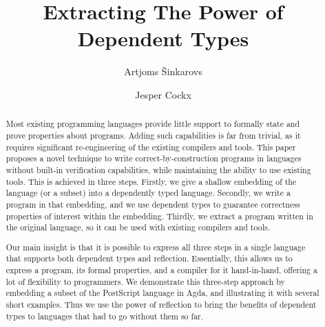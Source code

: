 \documentclass[sigplan,screen]{acmart}
\begin{document}
\title[]{Extracting The Power of Dependent Types}


\author[A. {\v{S}}inkarovs]{Artjoms {\v{S}}inkarovs}


\author[J. Cockx]{Jesper Cockx}


\begin{abstract}

  Most existing programming languages provide little support to formally
  state and prove properties about programs.  Ad\-ding such capabilities is far
  from trivial, as it requires significant re-engineering of the existing
  compilers and tools.  This paper proposes a novel technique to write
  correct-by-con\-struc\-tion programs in languages without built-in verification
  capabilities, while maintaining the ability to use existing tools.
  This is achieved in three steps.  Firstly, we
  give a shallow embedding of the language (or a subset) into a
  dependently typed language.  Secondly, we write a program
  in that embedding, and we use dependent types to guarantee
  correctness properties of interest within the embedding.  Thirdly, we
  extract a program written in the original language,
  so it can be used with existing compilers and tools.

  Our main insight is that it is possible to
  express all three steps in a single language that supports
  both dependent typ\-es and reflection. Essentially,
  this allows us to express a program, its formal properties, and
  a compiler for it hand-in-hand, offering a lot of flexibility to programmers.
  We demonstrate this three-step approach by embedding a subset of
  the PostScript language in Agda, and illustrating it with several short examples.
  Thus we use the power of reflection to bring the benefits of dependent types to languages
  that had to go without them so far.
\end{abstract}
\maketitle
\end{document}
